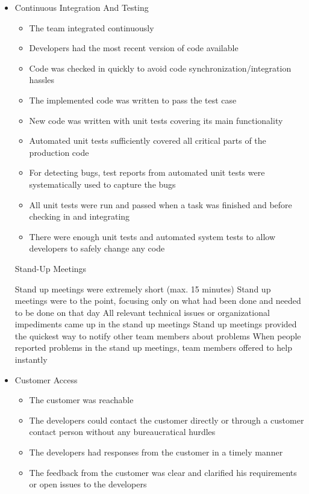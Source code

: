 \begin{itemize}
\begin{itemize}
		\end{itemize}
	\item Continuous Integration And Testing
		\begin{itemize}
			\item The team integrated continuously
			\item Developers had the most recent version of code available
			\item Code was checked in quickly to avoid code synchronization/integration hassles
			\item The implemented code was written to pass the test case
			\item New code was written with unit tests covering its main functionality
			\item Automated unit tests sufficiently covered all critical parts of the production code
			\item For detecting bugs, test reports from automated unit tests were systematically used to capture the bugs
			\item All unit tests were run and passed when a task was finished and before checking in and integrating
			\item There were enough unit tests and automated system tests to allow developers to safely change any code
		\end{itemize}
	\removed Stand-Up Meetings
		\begin{itemize}
			\removed Stand up meetings were extremely short (max. 15 minutes)
			\removed Stand up meetings were to the point, focusing only on what had been done and needed to be done on that day
			\removed All relevant technical issues or organizational impediments came up in the stand up meetings
			\removed Stand up meetings provided the quickest way to notify other team members about problems
			\removed When people reported problems in the stand up meetings, team members offered to help instantly
		\end{itemize}
	\item Customer Access
		\begin{itemize}
			\item The customer was reachable
			\item The developers could contact the customer directly or through a customer contact person without any bureaucratical hurdles
			\item The developers had responses from the customer in a timely manner
			\item The feedback from the customer was clear and clarified his requirements or open issues to the developers

\end{itemize}
\end{itemize}
